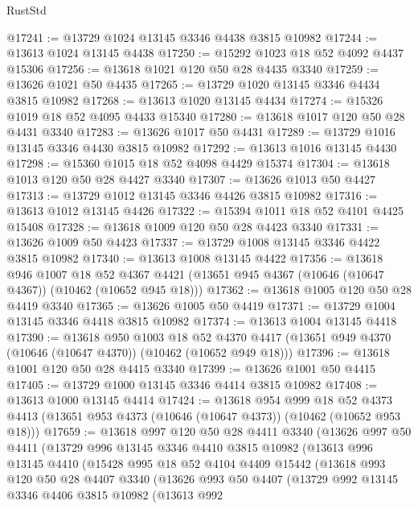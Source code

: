 \begin{lexlean}{RustStd}
\begin{coremodule}
@17241 := @13729 @1024 @13145 @3346 @4438 @3815 @10982
@17244 := @13613 @1024 @13145 @4438
@17250 := @15292 @1023 @18 @52 @4092 @4437 @15306
@17256 := @13618 @1021 @120 @50 @28 @4435 @3340
@17259 := @13626 @1021 @50 @4435
@17265 := @13729 @1020 @13145 @3346 @4434 @3815 @10982
@17268 := @13613 @1020 @13145 @4434
@17274 := @15326 @1019 @18 @52 @4095 @4433 @15340
@17280 := @13618 @1017 @120 @50 @28 @4431 @3340
@17283 := @13626 @1017 @50 @4431
@17289 := @13729 @1016 @13145 @3346 @4430 @3815 @10982
@17292 := @13613 @1016 @13145 @4430
@17298 := @15360 @1015 @18 @52 @4098 @4429 @15374
@17304 := @13618 @1013 @120 @50 @28 @4427 @3340
@17307 := @13626 @1013 @50 @4427
@17313 := @13729 @1012 @13145 @3346 @4426 @3815 @10982
@17316 := @13613 @1012 @13145 @4426
@17322 := @15394 @1011 @18 @52 @4101 @4425 @15408
@17328 := @13618 @1009 @120 @50 @28 @4423 @3340
@17331 := @13626 @1009 @50 @4423
@17337 := @13729 @1008 @13145 @3346 @4422 @3815 @10982
@17340 := @13613 @1008 @13145 @4422
@17356 := @13618
    @946
    @1007
    @18
    @52
    @4367
    @4421
    (@13651 @945 @4367 (@10646 (@10647 @4367)) (@10462 (@10652 @945 @18)))
@17362 := @13618 @1005 @120 @50 @28 @4419 @3340
@17365 := @13626 @1005 @50 @4419
@17371 := @13729 @1004 @13145 @3346 @4418 @3815 @10982
@17374 := @13613 @1004 @13145 @4418
@17390 := @13618
    @950
    @1003
    @18
    @52
    @4370
    @4417
    (@13651 @949 @4370 (@10646 (@10647 @4370)) (@10462 (@10652 @949 @18)))
@17396 := @13618 @1001 @120 @50 @28 @4415 @3340
@17399 := @13626 @1001 @50 @4415
@17405 := @13729 @1000 @13145 @3346 @4414 @3815 @10982
@17408 := @13613 @1000 @13145 @4414
@17424 := @13618
    @954
    @999
    @18
    @52
    @4373
    @4413
    (@13651 @953 @4373 (@10646 (@10647 @4373)) (@10462 (@10652 @953 @18)))
@17659 := @13618
    @997
    @120
    @50
    @28
    @4411
    @3340
    (@13626
      @997
      @50
      @4411
      (@13729
        @996
        @13145
        @3346
        @4410
        @3815
        @10982
        (@13613
          @996
          @13145
          @4410
          (@15428
            @995
            @18
            @52
            @4104
            @4409
            @15442
            (@13618
              @993
              @120
              @50
              @28
              @4407
              @3340
              (@13626
                @993
                @50
                @4407
                (@13729
                  @992
                  @13145
                  @3346
                  @4406
                  @3815
                  @10982
                  (@13613
                    @992

\end{coremodule}
\end{lexlean}
